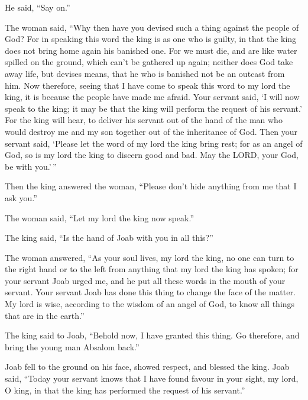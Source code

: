 He said, ``Say on.''

 The woman said, ``Why then have you devised such a thing
against the people of God? For in speaking this word the king is as one
who is guilty, in that the king does not bring home again his banished
one.  For we must die, and are like water spilled on the
ground, which can't be gathered up again; neither does God take away
life, but devises means, that he who is banished not be an outcast from
him.  Now therefore, seeing that I have come to speak
this word to my lord the king, it is because the people have made me
afraid. Your servant said, `I will now speak to the king; it may be that
the king will perform the request of his servant.'  For
the king will hear, to deliver his servant out of the hand of the man
who would destroy me and my son together out of the inheritance of God.
 Then your servant said, `Please let the word of my lord
the king bring rest; for as an angel of God, so is my lord the king to
discern good and bad. May the LORD, your God, be with you.'\,''

 Then the king answered the woman, ``Please don't hide
anything from me that I ask you.''

The woman said, ``Let my lord the king now speak.''

 The king said, ``Is the hand of Joab with you in all
this?''

The woman answered, ``As your soul lives, my lord the king, no one can
turn to the right hand or to the left from anything that my lord the
king has spoken; for your servant Joab urged me, and he put all these
words in the mouth of your servant.  Your servant Joab
has done this thing to change the face of the matter. My lord is wise,
according to the wisdom of an angel of God, to know all things that are
in the earth.''

 The king said to Joab, ``Behold now, I have granted this
thing. Go therefore, and bring the young man Absalom back.''

 Joab fell to the ground on his face, showed respect, and
blessed the king. Joab said, ``Today your servant knows that I have
found favour in your sight, my lord, O king, in that the king has
performed the request of his servant.''

